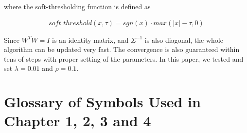 where the soft-thresholding function is defined as

\begin{align}\label{eq:eqA5}
soft\_threshold(x, \tau) = sgn(x)\cdot max(|x| - \tau, 0)
\end{align}

Since $W^{T}W = I$ is an identity matrix, and $\Sigma^{-1}$ is also diagonal, the whole algorithm can be updated very fast. The convergence is also guaranteed within tens of steps with proper setting of the parameters. In this paper, we tested and set $\lambda = 0.01$ and $\rho = 0.1$.


\chapter{Glossary of Symbols Used in Chapter 1, 2, 3 and 4} \label{App:AppendixB}



